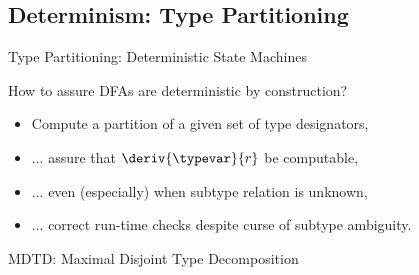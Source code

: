 \subsection{Determinism: Type Partitioning}

{  %
\begin{frame}{ Type Partitioning: Deterministic State Machines}

  How to assure DFAs are deterministic by construction?

  \begin{itemize}
  \item   Compute a  partition of a given set of type designators,
  \item   ... assure that $\deriv{\typevar}{r}$ be computable,
  \item   ... even (especially) when subtype relation is unknown,
  \item   ... correct run-time checks despite curse of subtype ambiguity.
  \end{itemize}

\end{frame}
}



\begin{frame}{MDTD: Maximal Disjoint Type Decomposition}
  \begin{columns}
    \begin{column}{0.5\textwidth}
    \end{column}
    \begin{column}{0.5\textwidth}
    \end{column}
  \end{columns}
\end{frame}

